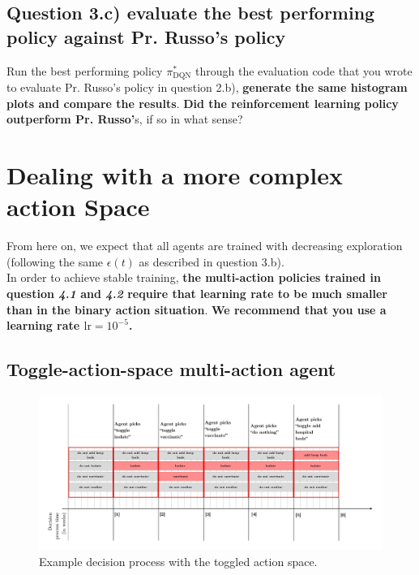 \documentclass[10pt]{article}
\begin{document}
\subsection*{Question 3.c) evaluate the best performing policy against Pr. Russo's policy}

Run the best performing policy $\pi^*_\text{DQN}$ through the evaluation code that you wrote to evaluate Pr. Russo's policy in question 2.b), \textbf{generate the same histogram plots and compare the results}. \textbf{Did the reinforcement learning policy outperform Pr. Russo'}s, if so in what sense?  

\section{Dealing with a more complex action Space}

From here on, we expect that all agents are trained with decreasing exploration (following the same $\epsilon(t)$ as described in question 3.b). \\

In order to achieve stable training, \textbf{the multi-action policies trained in question \textit{4.1} and \textit{4.2} require that learning rate to be much smaller than in the binary action situation}. \textbf{We recommend that you use a learning rate $\text{lr} = 10^{-5}$.}

\subsection{Toggle-action-space multi-action agent}


\begin{figure}[h!]
    \centering
    \includegraphics[width=\textwidth]{figures/toggle.png}
    \caption{Example decision process with the toggled action space.}
    \label{fig:toggle}
\end{figure}
\end{document}
